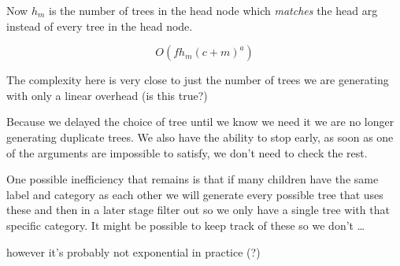 
Now $h_m$ is the number of trees in the head node which \emph{matches} the head arg instead of every tree in the head node.

$$
O(f h_m (c+m)^a)
$$

The complexity here is very close to just the number of trees we are generating with only a linear overhead (is this true?)

Because we delayed the choice of tree until we know we need it we are no longer generating duplicate trees.
We also have the ability to stop early, as soon as one of the arguments are impossible to satisfy, we don't need to check the rest.

One possible inefficiency that remains is that if many children have the same label and category as each other we will
generate every possible tree that uses these and then in a later stage filter out so we only have a single tree with that specific category. It might be possible to keep track of these so we don't \dots

however it's probably not exponential in practice (?)


